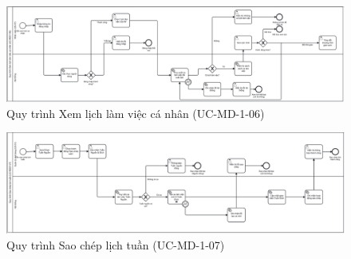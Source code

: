 


\begin{figure}[H]
	\centering
	\includegraphics[width=15cm]{Sections/tong_quan/functional_spec/img/1.6.png}

     \vspace{0.5cm}
    \caption{Quy trình Xem lịch làm việc cá nhân (UC-MD-1-06)}
\end{figure}


\begin{figure}[H]
	\centering
	\includegraphics[width=15cm]{Sections/tong_quan/functional_spec/img/1.7.png}

     \vspace{0.5cm}
    \caption{Quy trình Sao chép lịch tuần (UC-MD-1-07)}
\end{figure}


